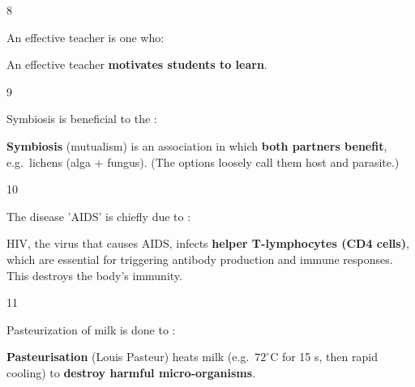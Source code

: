 \begin{question}{8}
{An effective teacher is one who:\par}
\begin{explain}
An effective teacher \textbf{motivates students to learn}.
\end{explain}
\end{question}

\begin{question}{9}
{Symbiosis is beneficial to the :\par}
\begin{explain}
\textbf{Symbiosis} (mutualism) is an association in which \textbf{both partners benefit}, e.g.\ lichens (alga $+$ fungus). (The options loosely call them host and parasite.)
\end{explain}
\end{question}

\begin{question}{10}
{The disease 'AIDS' is chiefly due to :\par}
\begin{explain}
HIV, the virus that causes AIDS, infects \textbf{helper T-lymphocytes (CD4 cells)}, which are essential for triggering antibody production and immune responses. This destroys the body's immunity.
\end{explain}
\end{question}

\begin{question}{11}
{Pasteurization of milk is done to :\par}
\begin{explain}
\textbf{Pasteurisation} (Louis Pasteur) heats milk (e.g.\ $72^\circ$C for 15 s, then rapid cooling) to \textbf{destroy harmful micro-organisms}.
\end{explain}
\end{question}

